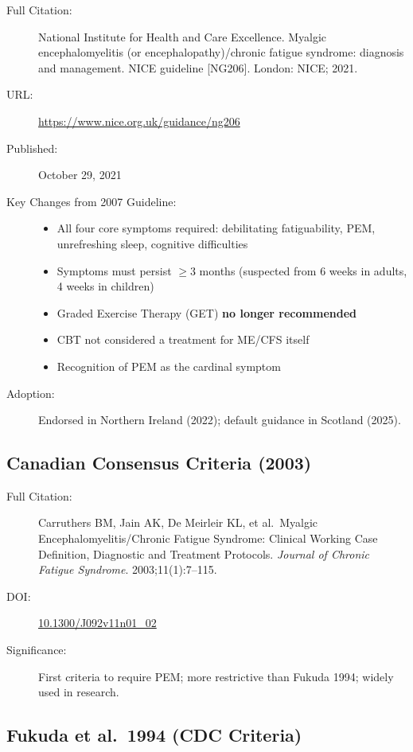 \begin{description}
    \item[Full Citation:] National Institute for Health and Care Excellence. Myalgic encephalomyelitis (or encephalopathy)/chronic fatigue syndrome: diagnosis and management. NICE guideline [NG206]. London: NICE; 2021.
    \item[URL:] \url{https://www.nice.org.uk/guidance/ng206}
    \item[Published:] October 29, 2021
    \item[Key Changes from 2007 Guideline:]
    \begin{itemize}
        \item All four core symptoms required: debilitating fatiguability, PEM, unrefreshing sleep, cognitive difficulties
        \item Symptoms must persist $\geq$3 months (suspected from 6 weeks in adults, 4 weeks in children)
        \item Graded Exercise Therapy (GET) \textbf{no longer recommended}
        \item CBT not considered a treatment for ME/CFS itself
        \item Recognition of PEM as the cardinal symptom
    \end{itemize}
    \item[Adoption:] Endorsed in Northern Ireland (2022); default guidance in Scotland (2025).
\end{description}

\subsection{Canadian Consensus Criteria (2003)}

\begin{description}
    \item[Full Citation:] Carruthers BM, Jain AK, De Meirleir KL, et al.\ Myalgic Encephalomyelitis/Chronic Fatigue Syndrome: Clinical Working Case Definition, Diagnostic and Treatment Protocols. \textit{Journal of Chronic Fatigue Syndrome}. 2003;11(1):7--115.
    \item[DOI:] \href{https://doi.org/10.1300/J092v11n01_02}{10.1300/J092v11n01\_02}
    \item[Significance:] First criteria to require PEM; more restrictive than Fukuda 1994; widely used in research.
\end{description}

\subsection{Fukuda et al.\ 1994 (CDC Criteria)}

